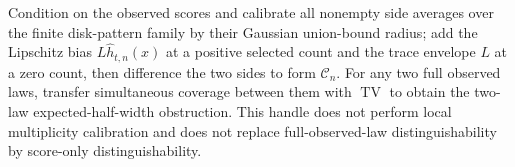 Condition on the observed scores and calibrate all nonempty side averages over the finite disk-pattern family by their Gaussian union-bound radius; add the Lipschitz bias \(L\widehat h_{t,n}(x)\) at a positive selected count and the trace envelope \(L\) at a zero count, then difference the two sides to form \(\mathcal C_n\). For any two full observed laws, transfer simultaneous coverage between them with \(\operatorname{TV}\) to obtain the two-law expected-half-width obstruction. This handle does not perform local multiplicity calibration and does not replace full-observed-law distinguishability by score-only distinguishability.